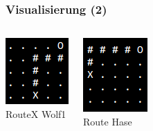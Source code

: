 \documentclass{beamer}
\begin{document}
\begin{frame}
\frametitle{Visualisierung (2)}
\begin{columns}[c] %

\includegraphics[scale=1]{wolf_route.png}\\
RouteX Wolf1

\includegraphics[scale=1]{hare_route.png}\\
Route Hase
\end{columns}
\end{frame}
\end{document}
